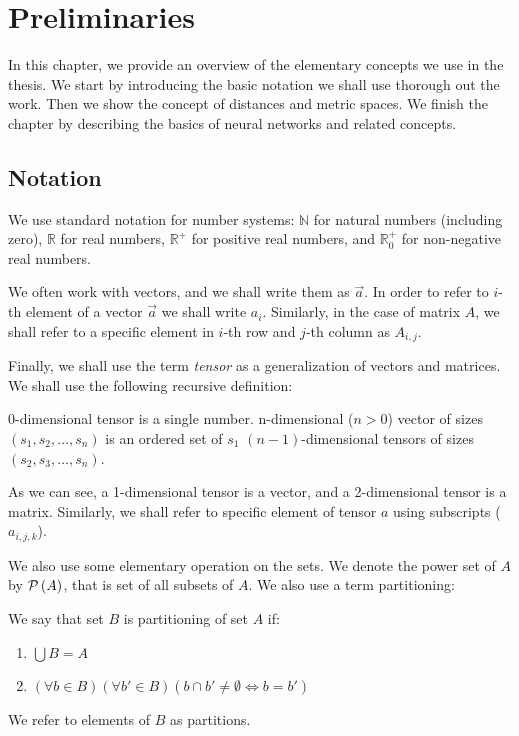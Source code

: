 \chapter{Preliminaries}

\label{ch:preliminaries}

In this chapter, we provide an overview of the elementary concepts we use in the thesis. We start by introducing the basic notation we shall use thorough out the work. Then we show the concept of distances and metric spaces. We finish the chapter by describing the basics of neural networks and related concepts.

\section{Notation}

We use standard notation for number systems: $\mathbb{N}$ for natural numbers (including zero), $\mathbb{R}$ for real numbers, $\mathbb{R}^+$ for positive real numbers, and $\mathbb{R}^+_0$ for non-negative real numbers.


We often work with vectors, and we shall write them as $\vec{a}$. In order to refer to $i$-th element of a vector $\vec{a}$ we shall write $a_i$. Similarly, in the case of matrix $A$, we shall refer to a specific element in $i$-th row and $j$-th column as $A_{i,j}$.

Finally, we shall use the term \emph{tensor} as a generalization of vectors and matrices. We shall use the following recursive definition:

\begin{defn}
0-dimensional tensor is a single number. n-dimensional ($n > 0$) vector of sizes
$(s_1, s_2, \ldots, s_n)$ is an ordered set of $s_1$ $(n-1)$-dimensional
tensors of sizes $(s_2, s_3, \ldots, s_n)$.
\end{defn}

As we can see, a 1-dimensional tensor is a vector, and a 2-dimensional tensor is a matrix. Similarly, we shall refer to specific element of tensor $a$ using subscripts ($a_{i,j,k}$).

We also use some elementary operation on the sets. We denote the power set of $A$ by $\mathcal{P}\left(A\right)$, that is set of all subsets of $A$. We also use a term partitioning:

\begin{defn}
We say that set $B$ is partitioning of set $A$ if:
\begin{enumerate}[label=(\roman*)]
    \item $\bigcup B = A$
    \item $(\forall b \in B) (\forall b' \in B) (b \cap b' \neq \emptyset \Leftrightarrow b = b')$
\end{enumerate}
We refer to elements of $B$ as partitions.
\end{defn}

